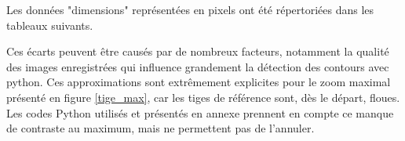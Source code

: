 \documentclass[11pt,letterpaper]{article}
\begin{document}
Les données "dimensions" représentées en pixels ont été répertoriées dans les tableaux suivants.

\begin{table}[H]
\centering
{}
\caption{Tableau du nombre de pixels en fonction des tiges de référence pour le zoom minimum.}
\label{tige_min}
\end{table}

\begin{table}[H]
\centering
{}
\caption{Tableau du nombre de pixels en fonction des tiges de référence pour le zoom maximum.}
\label{tige_max}
\end{table}

Ces écarts peuvent être causés par de nombreux facteurs, notamment la qualité des images enregistrées qui influence grandement la détection des contours avec python. Ces approximations sont extrêmement explicites pour le zoom maximal présenté en figure \ref{tige_max}, car les tiges de référence sont, dès le départ, floues. Les codes Python utilisés et présentés en annexe prennent en compte ce manque de contraste au maximum, mais ne permettent pas de l'annuler.
\end{document}
